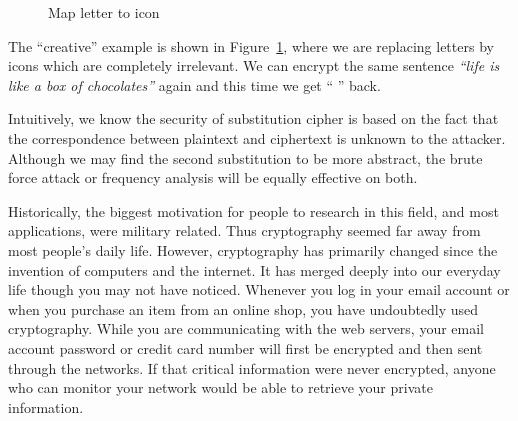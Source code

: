 \begin{figure}[ht]
    \centering
    \setlength\tabcolsep{3pt}
    \caption{Map letter to icon}\label{fig:replace-letter-by-icon}
\end{figure}
The ``creative'' example is shown in Figure~\ref{fig:replace-letter-by-icon}, where we are replacing letters by icons which are completely irrelevant. We can encrypt the same sentence \textit{``\;life is like a box of chocolates''} again and this time we get ``\faImage{} \faFilm{} \faSave{} \faAsterisk{} \faFilm{} \faPaperPlane{} \faImage{} \faFilm{} \faHashtag{} \faAsterisk{} \faTv{} \faEnvelope{} \faLeaf{} \faWifi{} \faLeaf{} \faSave{} \faBank{} \faDiamond{} \faLeaf{} \faBank{} \faLeaf{} \faImage{} \faTv{} \faQrcode{} \faAsterisk{} \faPaperPlane{}\;'' back.
\par Intuitively, we know the security of substitution cipher is based on the fact that the correspondence between plaintext and ciphertext is unknown to the attacker. Although we may find the second substitution to be more abstract, the brute force attack or frequency analysis will be equally effective on both.
\par Historically, the biggest motivation for people to research in this field, and most applications, were military related. Thus cryptography seemed far away from most people's daily life. However, cryptography has primarily changed since the invention of computers and the internet. It has merged deeply into our everyday life though you may not have noticed. Whenever you log in your email account or when you purchase an item from an online shop, you have undoubtedly used cryptography. While you are communicating with the web servers, your email account password or credit card number will first be encrypted and then sent through the networks. If that critical information were never encrypted, anyone who can monitor your network would be able to retrieve your private information.
